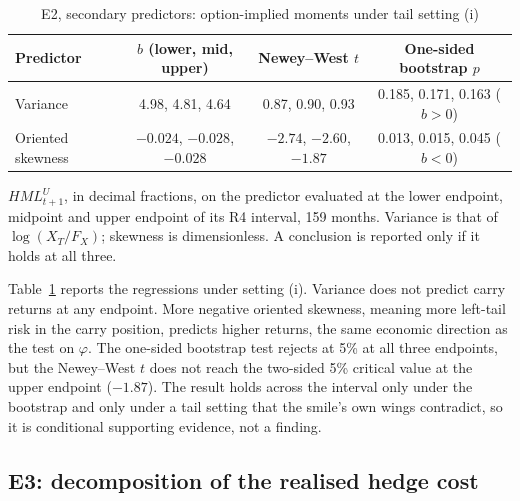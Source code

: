 \documentclass[11pt]{article}
\theoremstyle{result}
\newcommand{\HML}{\mathit{HML}}
\begin{document}
\begin{table}[t]
\centering\small
\caption{E2, secondary predictors: option-implied moments under tail setting (i)}\label{tab:mom}
\begin{tabular}{lccc}
\toprule
Predictor & $b$ (lower, mid, upper) & Newey--West $t$ & One-sided bootstrap $p$ \\
\midrule
Variance & 4.98, 4.81, 4.64 & 0.87, 0.90, 0.93 & 0.185, 0.171, 0.163 ($b>0$) \\
Oriented skewness & $-0.024$, $-0.028$, $-0.028$ & $-2.74$, $-2.60$, $-1.87$ & 0.013, 0.015, 0.045 ($b<0$) \\
\bottomrule
\end{tabular}
\par\medskip
\begin{minipage}{0.97\linewidth}\footnotesize
$\HML^U_{t+1}$, in decimal fractions, on the predictor evaluated at the lower endpoint, midpoint and upper endpoint of its R4 interval, 159 months. Variance is that of $\log(X_T/F_X)$; skewness is dimensionless. A conclusion is reported only if it holds at all three.
\end{minipage}
\end{table}

Table~\ref{tab:mom} reports the regressions under setting (i). Variance does not predict carry returns at any endpoint. More negative oriented skewness, meaning more left-tail risk in the carry position, predicts higher returns, the same economic direction as the test on $\varphi$. The one-sided bootstrap test rejects at 5\% at all three endpoints, but the Newey--West $t$ does not reach the two-sided 5\% critical value at the upper endpoint ($-1.87$). The result holds across the interval only under the bootstrap and only under a tail setting that the smile's own wings contradict, so it is conditional supporting evidence, not a finding.

\subsection{E3: decomposition of the realised hedge cost}\label{sec:e3}
\end{document}
